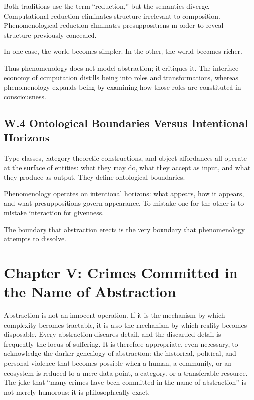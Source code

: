 \documentclass[12pt,letterpaper]{article}
\begin{document}
Both traditions use the term ``reduction,'' but the semantics diverge. Computational reduction eliminates structure irrelevant to composition. Phenomenological reduction eliminates presuppositions in order to reveal structure previously concealed.

In one case, the world becomes simpler.  
In the other, the world becomes richer.

Thus phenomenology does not model abstraction; it critiques it. The interface economy of computation distills being into roles and transformations, whereas phenomenology expands being by examining how those roles are constituted in consciousness.

\subsection{W.4 Ontological Boundaries Versus Intentional Horizons}

Type classes, category-theoretic constructions, and object affordances all operate at the surface of entities: what they may do, what they accept as input, and what they produce as output. They define ontological boundaries.

Phenomenology operates on intentional horizons: what appears, how it appears, and what presuppositions govern appearance. To mistake one for the other is to mistake interaction for givenness.

The boundary that abstraction erects is the very boundary that phenomenology attempts to dissolve.

\newpage

\section{Chapter V: Crimes Committed in the Name of Abstraction}

Abstraction is not an innocent operation. If it is the mechanism by which complexity becomes tractable, it is also the mechanism by which reality becomes disposable. Every abstraction discards detail, and the discarded detail is frequently the locus of suffering. It is therefore appropriate, even necessary, to acknowledge the darker genealogy of abstraction: the historical, political, and personal violence that becomes possible when a human, a community, or an ecosystem is reduced to a mere data point, a category, or a transferable resource. The joke that ``many crimes have been committed in the name of abstraction'' is not merely humorous; it is philosophically exact.
\end{document}
